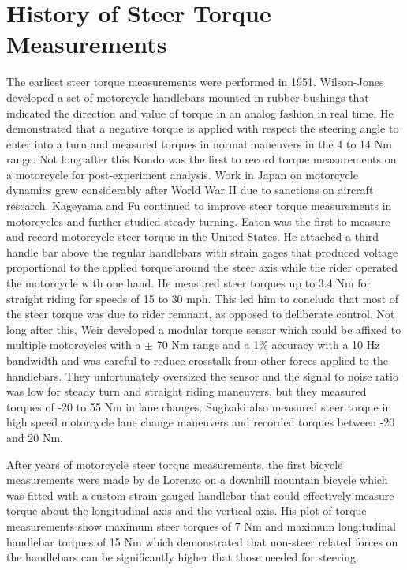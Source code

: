 \documentclass[a4paper]{article}
\begin{document}
\section*{History of Steer Torque Measurements}

The earliest steer torque measurements were performed in 1951. Wilson-Jones
\cite{Wilson-Jones1951} developed a set of motorcycle handlebars mounted in
rubber bushings that indicated the direction and value of torque in an analog
fashion in real time. He demonstrated that a negative torque is applied with
respect the steering angle to enter into a turn and measured torques in normal
maneuvers in the 4 to 14 Nm range. Not long after this Kondo \cite{Kondo1955}
was the first to record torque measurements on a motorcycle for post-experiment
analysis. Work in Japan on motorcycle dynamics grew considerably after World
War II due to sanctions on aircraft research. Kageyama \cite{Kageyama1959} and
Fu \cite{Fu1965} continued to improve steer torque measurements in motorcycles
and further studied steady turning. Eaton \cite{Eaton1973} was the first to
measure and record motorcycle steer torque in the United States. He attached a
third handle bar above the regular handlebars with strain gages that produced
voltage proportional to the applied torque around the steer axis while the
rider operated the motorcycle with one hand. He measured steer torques up to
3.4 Nm for straight riding for speeds of 15 to 30 mph. This led him to conclude
that most of the steer torque was due to rider remnant, as opposed to
deliberate control. Not long after this, Weir \cite{Weir1979a} developed a
modular torque sensor which could be affixed to multiple motorcycles with a
$\pm$ 70 Nm range and a 1\% accuracy with a 10 Hz bandwidth and was careful to
reduce crosstalk from other forces applied to the handlebars. They
unfortunately oversized the sensor and the signal to noise ratio was low for
steady turn and straight riding maneuvers, but they measured torques of -20 to
55 Nm in lane changes. Sugizaki \cite{Sugizaki1988} also measured steer torque
in high speed motorcycle lane change maneuvers and recorded torques between -20
and 20 Nm.

After years of motorcycle steer torque measurements, the first bicycle
measurements were made by de Lorenzo \cite{Lorenzo1997} on a downhill mountain
bicycle which was fitted with a custom strain gauged handlebar that could
effectively measure torque about the longitudinal axis and the vertical axis.
His plot of torque measurements show maximum steer torques of 7 Nm and maximum
longitudinal handlebar torques of 15 Nm which demonstrated that non-steer
related forces on the handlebars can be significantly higher that those needed
for steering.
\end{document}
